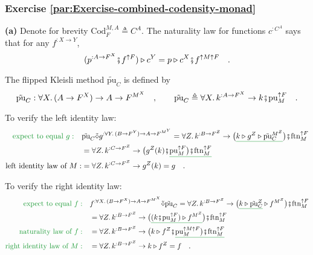 \subsubsection*{Exercise \ref{par:Exercise-combined-codensity-monad}}

\textbf{(a)} Denote for brevity $\text{Cod}_{F}^{M,A}\triangleq C^{A}$.
The naturality law for functions $c^{:C^{A}}$ says that for any $f^{:X\rightarrow Y}$,
\[
(p^{:A\rightarrow F^{X}}\bef f^{\uparrow F})\triangleright c^{Y}=p\triangleright c^{X}\bef f^{\uparrow M\uparrow F}\quad.
\]

The flipped Kleisli method $\tilde{\text{pu}}_{C}$ is defined by
\[
\tilde{\text{pu}}_{C}:\forall X.\,(A\rightarrow F^{X})\rightarrow A\rightarrow F^{M^{X}}\quad,\quad\quad\tilde{\text{pu}}_{C}\triangleq\forall X.\,k^{:A\rightarrow F^{X}}\rightarrow k\bef\text{pu}_{M}^{\uparrow F}\quad.
\]

To verify the left identity law:
\begin{align*}
{\color{greenunder}\text{expect to equal }g:}\quad & \tilde{\text{pu}}_{C}\tilde{\diamond}g^{:\forall Y.\,(B\rightarrow F^{Y})\rightarrow A\rightarrow F^{M^{Y}}}=\forall Z.\,k^{:B\rightarrow F^{Z}}\rightarrow\big(\gunderline{k\triangleright g^{Z}\triangleright\tilde{\text{pu}}_{C}^{M^{Z}}}\big)\bef\text{ftn}_{M}^{\uparrow F}\\
 & =\forall Z.\,k^{:C\rightarrow F^{Z}}\rightarrow\big(g^{Z}(k)\bef\gunderline{\text{pu}_{M}^{\uparrow F}\big)\bef\text{ftn}_{M}^{\uparrow F}}\\
\text{left identity law of }M: & =\forall Z.\,k^{:C\rightarrow F^{Z}}\rightarrow g^{Z}(k)=g\quad.
\end{align*}

To verify the right identity law:
\begin{align*}
{\color{greenunder}\text{expect to equal }f:}\quad & f^{:\forall X.\,(B\rightarrow F^{X})\rightarrow A\rightarrow F^{M^{X}}}\tilde{\diamond}\tilde{\text{pu}}_{C}=\forall Z.\,k^{:B\rightarrow F^{Z}}\rightarrow\big(\gunderline{k\triangleright\tilde{\text{pu}}_{C}^{Z}}\triangleright f^{M^{Z}}\big)\bef\text{ftn}_{M}^{\uparrow F}\\
 & =\forall Z.\,k^{:B\rightarrow F^{Z}}\rightarrow\big(\gunderline{(k\bef\text{pu}_{M}^{\uparrow F})\triangleright f^{M^{Z}}}\big)\bef\text{ftn}_{M}^{\uparrow F}\\
{\color{greenunder}\text{naturality law of }f:}\quad & =\forall Z.\,k^{:B\rightarrow F^{Z}}\rightarrow\big(k\triangleright f^{Z}\bef\gunderline{\text{pu}_{M}^{\uparrow M\uparrow F}\big)\bef\text{ftn}_{M}^{\uparrow F}}\\
{\color{greenunder}\text{right identity law of }M:}\quad & =\forall Z.\,k^{:B\rightarrow F^{Z}}\rightarrow k\triangleright f^{Z}=f\quad.
\end{align*}

